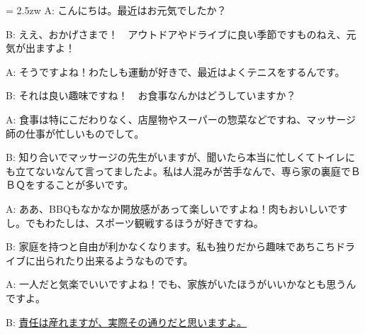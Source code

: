 \documentclass[11pt]{amsart}
\title{}
\author{}
\newenvironment{hangall}[1]{\hangindent = 2.5zw\everypar{\hangindent = 2.5zw}}{}
\begin{document}
\maketitle
\begin{hangall}{}%
A: こんにちは。最近はお元気でしたか？

B: ええ、おかげさまで！　アウトドアやドライブに良い季節ですものねえ、元気が出ますよ！

A: そうですよね！わたしも運動が好きで、最近はよくテニスをするんです。

B: それは良い趣味ですね！　お食事なんかはどうしていますか？

A: 食事は特にこだわりなく、店屋物やスーパーの惣菜などですね、マッサージ師の仕事が忙しいものでして。

B: 知り合いでマッサージの先生がいますが、聞いたら本当に忙しくてトイレにも立てないなんて言ってましたよ。私は人混みが苦手なんで、専ら家の裏庭でＢＢＱをすることが多いです。

A: ああ、BBQもなかなか開放感があって楽しいですよね！肉もおいしいですし。でもわたしは、スポーツ観戦するほうが好きですね。

B: 家庭を持つと自由が利かなくなります。私も独りだから趣味であちこちドライブに出られたり出来るようなものです。

A: 一人だと気楽でいいですよね！でも、家族がいたほうがいいかなとも思うんですよ。

B: \ul{責任は産れますが、実際その通りだと思いますよ。}\end{hangall}
\end{document}
